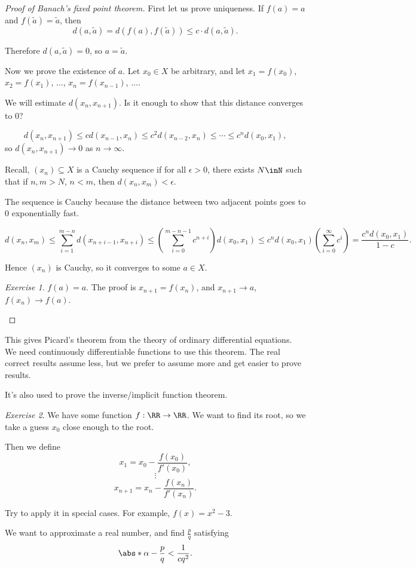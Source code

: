 \documentclass{article}
\theoremstyle{remark}
\newtheorem{exercise}{Exercise}
\begin{document}
\begin{proof}[Proof of Banach's fixed point theorem]
    First let us prove uniqueness. If $f(a) = a$ and 
    $f(\tilde{a})=\tilde{a}$, then \newcommand\til[1]{\tilde{#1}}
    \[ d(a,\til{a}) = d(f(a),f(\til{a})) \le c \cdot d(a,\til{a}). \]

    Therefore $d(a,\til{a})=0$, so $a=\til{a}$.
    
    Now we prove the existence of $a$. Let $x_0\in X$ be 
    arbitrary, and let $x_1=f(x_0)$, $x_2=f(x_1)$, $\ldots$,
    $x_n=f(x_{n-1})$, $\ldots$. 

    We will estimate $d(x_n,x_{n+1})$. Is it enough to show that
    this distance converges to $0$? 

    \[ d(x_n,x_{n+1}) \le cd(x_{n-1},x_n) \le c^2 d(x_{n-2},x_n)
    \le \cdots \le c^n d(x_0,x_1), \]
    so $d(x_n,x_{n+1}) \to 0$ as $n\to \infty$.

    Recall, $(x_n)\subseteq X$ is a Cauchy sequence if for all
    $\epsilon > 0$, there exists $N \inN$ such that if 
    $n,m > N$, $n< m$, then $d(x_n,x_m) < \epsilon$.

    The sequence is Cauchy because the distance between two 
    adjacent points goes to $0$ exponentially fast.

    \[ d(x_n,x_m) \le \sum_{i=1}^{m-n} d(x_{n+i-1},x_{n+i})
    \le \left(\sum_{i=0}^{m-n-1} c^{n+i} \right)d(x_0,x_1)
    \le c^n d(x_0,x_1)\left(\sum_{i=0}^\infty c^i\right)
    = \frac{c^nd(x_0,x_1)}{1-c}.  \]

    Hence $(x_n)$ is Cauchy, so it converges to some $a\in X$.

    \begin{exercise}
        $f(a)=a$. The proof is $x_{n+1}=f(x_n)$, and $x_{n+1}\to a$,
        $f(x_n)\to f(a)$.
    \end{exercise}
\end{proof}

This gives Picard's theorem from the theory of ordinary
differential equations. We need continuously differentiable
functions to use this theorem. The real correct results assume less,
but we prefer to assume more and get easier to prove results.

It's also used to prove the inverse/implicit function theorem.

\begin{exercise}
    We have some function $f:\RR\to \RR$. We want to find its
    root, so we take a guess $x_0$ close enough to the root.

    Then we define \[ x_1 = x_0 - \frac{f(x_0)}{f'(x_0)},\]
    \[ \vdots \]
    \[ x_{n+1} = x_n -\frac{f(x_n)}{f'(x_n)}. \]

    Try to apply it in special cases. For example, $f(x)=x^2-3$.

    We want to approximate a real number, and find $\frac{p}{q}$
    satisfying
    \[ \abs*{\alpha - \frac{p}{q}} < \frac{1}{cq^2}. \]
\end{exercise}
\end{document}
